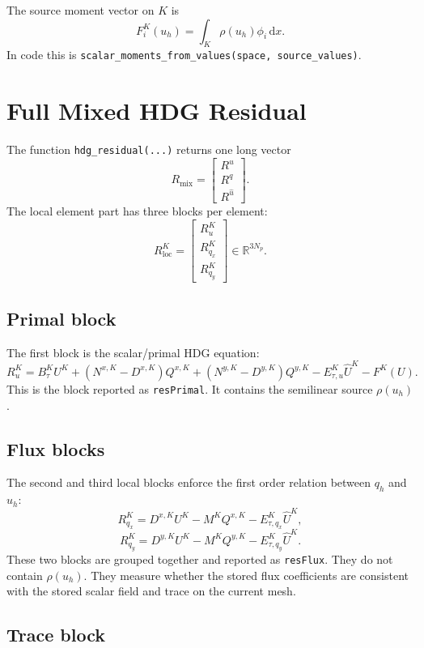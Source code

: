 \documentclass[11pt]{article}
\newcommand{\dd}{\,\mathrm d}
\begin{document}
The source moment vector on \(K\) is
\[
  F^K_i(u_h)
  =
  \int_K \rho(u_h)\phi_i \dd x.
\]
In code this is \texttt{scalar\_moments\_from\_values(space,
source\_values)}.

\section{Full Mixed HDG Residual}

The function \texttt{hdg\_residual(...)} returns one long vector
\[
  R_{\mathrm{mix}}
  =
  \begin{bmatrix}
    R^u \\
    R^q \\
    R^{\widehat u}
  \end{bmatrix}.
\]
The local element part has three blocks per element:
\[
  R^K_{\mathrm{loc}}
  =
  \begin{bmatrix}
    R^K_u \\
    R^K_{q_x} \\
    R^K_{q_y}
  \end{bmatrix}
  \in \mathbb R^{3N_p}.
\]

\subsection{Primal block}

The first block is the scalar/primal HDG equation:
\[
  R^K_u
  =
  B^K_\tau U^K
  + (N^{x,K}-D^{x,K})Q^{x,K}
  + (N^{y,K}-D^{y,K})Q^{y,K}
  - E^K_{\tau,u}\widehat U^K
  - F^K(U).
\]
This is the block reported as \texttt{resPrimal}.  It contains the
semilinear source \(\rho(u_h)\).

\subsection{Flux blocks}

The second and third local blocks enforce the first order relation
between \(q_h\) and \(u_h\):
\[
  R^K_{q_x}
  =
  D^{x,K}U^K
  - M^K Q^{x,K}
  - E^K_{\tau,q_x}\widehat U^K,
\]
\[
  R^K_{q_y}
  =
  D^{y,K}U^K
  - M^K Q^{y,K}
  - E^K_{\tau,q_y}\widehat U^K.
\]
These two blocks are grouped together and reported as \texttt{resFlux}.
They do not contain \(\rho(u_h)\).  They measure whether the stored flux
coefficients are consistent with the stored scalar field and trace on
the current mesh.

\subsection{Trace block}
\end{document}
